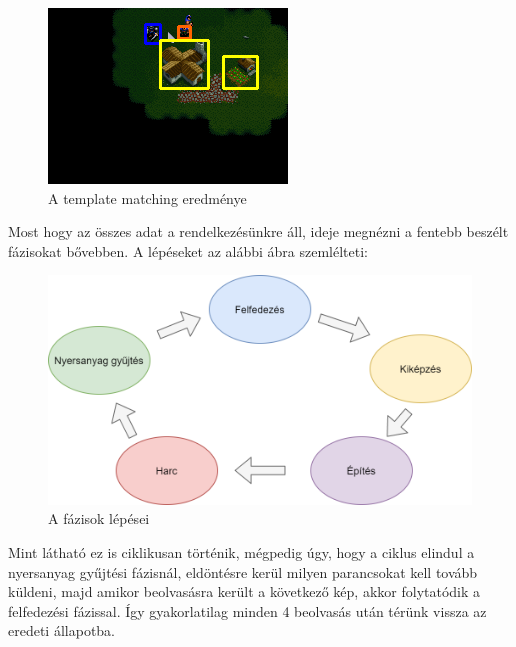 \begin{figure}[h]
    \centering
    \includegraphics[scale=1]{images/res.png}
    \caption{A template matching eredménye}
    \label{fig:rect}
\end{figure}
\pagebreak
Most hogy az összes adat a rendelkezésünkre áll, ideje megnézni a fentebb beszélt fázisokat bővebben.
A lépéseket az alábbi ábra szemlélteti:
\begin{figure}[h]
    \centering
    \includegraphics[scale=0.4]{images/phases.png}
    \caption{A fázisok lépései}
    \label{fig:phases}
\end{figure}

Mint látható ez is ciklikusan történik, mégpedig úgy, hogy a ciklus elindul a nyersanyag gyűjtési fázisnál, eldöntésre kerül milyen parancsokat kell tovább küldeni, majd amikor beolvasásra került a következő kép, akkor folytatódik a felfedezési fázissal. Így gyakorlatilag minden 4 beolvasás után térünk vissza az eredeti állapotba.

